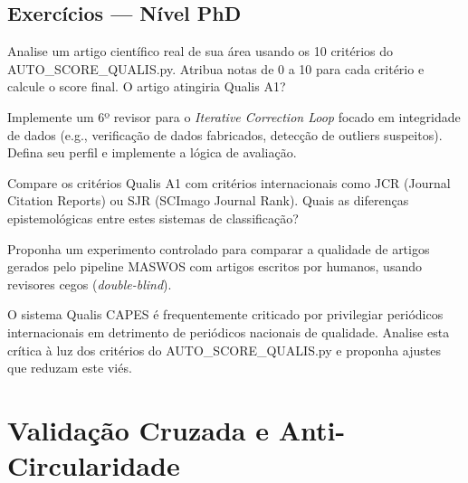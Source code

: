 \subsection{Exercícios — Nível PhD}

\begin{exercicio}
Analise um artigo científico real de sua área usando os 10 critérios
do AUTO\_SCORE\_QUALIS.py. Atribua notas de 0 a 10 para cada
critério e calcule o score final. O artigo atingiria Qualis A1?
\end{exercicio}

\begin{exercicio}
Implemente um 6º revisor para o \textit{Iterative Correction Loop}
focado em integridade de dados (e.g., verificação de dados
fabricados, detecção de outliers suspeitos). Defina seu perfil e
implemente a lógica de avaliação.
\end{exercicio}

\begin{exercicio}
Compare os critérios Qualis A1 com critérios internacionais como
JCR (Journal Citation Reports) ou SJR (SCImago Journal Rank). Quais
as diferenças epistemológicas entre estes sistemas de classificação?
\end{exercicio}

\begin{exercicio}
Proponha um experimento controlado para comparar a qualidade de
artigos gerados pelo pipeline MASWOS com artigos escritos por
humanos, usando revisores cegos (\textit{double-blind}).
\end{exercicio}

\begin{exercicio}
O sistema Qualis CAPES é frequentemente criticado por privilegiar
periódicos internacionais em detrimento de periódicos nacionais de
qualidade. Analise esta crítica à luz dos critérios do
AUTO\_SCORE\_QUALIS.py e proponha ajustes que reduzam este viés.
\end{exercicio}

\section{Validação Cruzada e Anti-Circularidade}
\label{sec:cross-validation}
\nivelavancado

